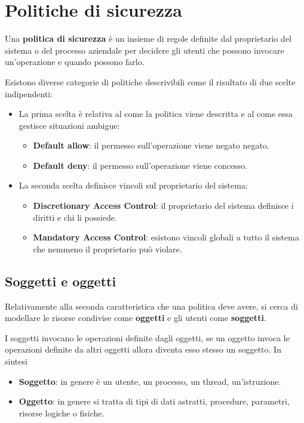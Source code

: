 \section{Politiche di sicurezza}
Una \textbf{politica di sicurezza} è un insieme di regole definite dal proprietario del sistema o del processo
aziendale per decidere gli utenti che possono invocare un'operazione e quando possono farlo.

Esistono diverse categorie di politiche descrivibili come il risultato di due scelte indipendenti:
\begin{itemize}
	\item La prima scelta è relativa al come la politica viene descritta e al come essa gestisce situazioni ambigue:
	      \begin{itemize}
		      \item \textbf{Default allow}: il permesso sull'operazione viene negato negato.
		      \item \textbf{Default deny}: il permesso sull'operazione viene concesso.
	      \end{itemize}
	\item La seconda scelta definisce vincoli sul proprietario del sistema:
	      \begin{itemize}
		      \item \textbf{Discretionary Access Control}: il proprietario del sistema definisce i diritti e chi li
		            possiede.
		      \item \textbf{Mandatory Access Control}: esistono vincoli globali a tutto il sistema che nemmeno il
		            proprietario può violare.
	      \end{itemize}
\end{itemize}

\subsection{Soggetti e oggetti}
Relativamente alla seconda caratteristica che una politica deve avere, si cerca di modellare le risorse condivise
come \textbf{oggetti} e gli utenti come \textbf{soggetti}.

I soggetti invocano le operazioni definite dagli oggetti, se un oggetto invoca le operazioni definite da altri
oggetti allora diventa esso stesso un soggetto. In sintesi
\begin{itemize}
	\item \textbf{Soggetto}: in genere è un utente, un processo, un thread, un'istruzione.
	\item \textbf{Oggetto}: in genere si tratta di tipi di dati astratti, procedure, parametri, risorse logiche o
	      fisiche.
\end{itemize}

